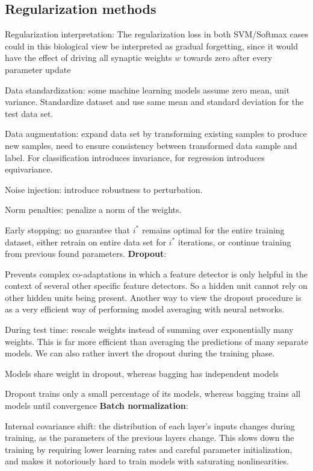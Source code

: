 \documentclass[12pt]{article}
\begin{document}
\subsection{Regularization methods}
\par Regularization interpretation: The regularization loss in both SVM/Softmax cases could in this biological view be interpreted as gradual forgetting, since it would have the effect of driving all synaptic weights $w$ towards zero after every parameter update
\ulb
\item Data standardization: some machine learning models assume zero mean, unit variance. Standardize dataset and use same mean and standard deviation for the test data set.
\item Data augmentation: expand data set by transforming existing samples to produce new samples, need to ensure consistency between transformed data sample and label. For classification introduces invariance, for regression introduces equivariance.
\item Noise injection: introduce robustness to perturbation.
\item Norm penalties: penalize a norm of the weights.
\item Early stopping: no guarantee that $i^*$ remains optimal for the entire training dataset, either retrain on entire data set for $i^*$ iterations, or continue training from previous found parameters.
\ule
\textbf{Dropout}:
\ulb
\item Prevents complex co-adaptations in which a feature detector is only helpful in the context of several other specific feature detectors. So a hidden unit cannot rely on other hidden units being present. Another way to view the dropout procedure is as a very efficient way of performing model averaging with neural networks.
\item During test time: rescale weights instead of summing over exponentially many weights. This is far more efficient than averaging the predictions of many separate models. We can also rather invert the dropout during the training phase.
\item Models share weight in dropout, whereas bagging has independent models
\item Dropout trains only a small percentage of its models, whereas bagging trains all models until convergence
\ule
\textbf{Batch normalization}:
\ulb
\item Internal covariance shift: the distribution of each layer’s inputs changes during training, as the parameters of the previous layers change. This slows down the training by requiring lower learning rates and careful parameter initialization, and makes it notoriously hard to train models with saturating nonlinearities.
\end{document}
